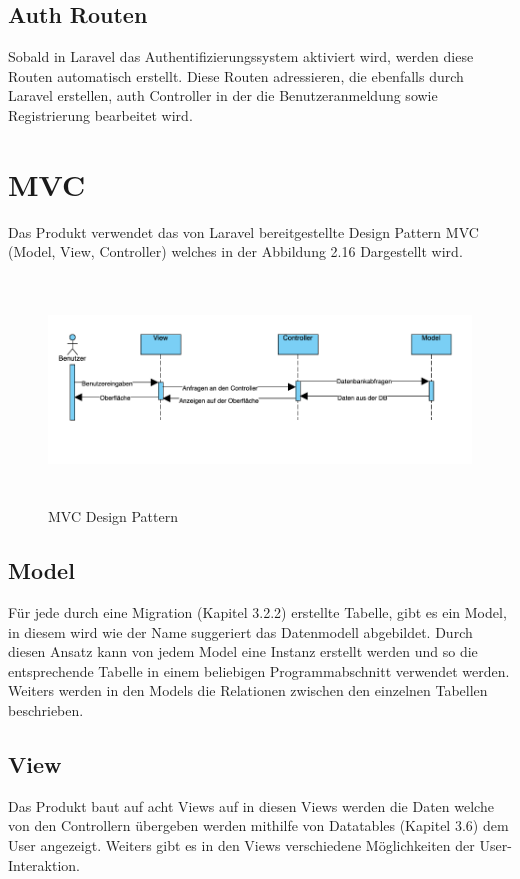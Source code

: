 \subsection{Auth Routen}
Sobald in Laravel das Authentifizierungssystem aktiviert wird, werden diese Routen automatisch erstellt. Diese Routen adressieren, die ebenfalls durch Laravel erstellen, auth Controller in der die Benutzeranmeldung sowie Registrierung bearbeitet wird.

\newpage
\section{MVC}\label{sec: MVC}
Das Produkt verwendet das von Laravel bereitgestellte Design Pattern MVC (Model, View, Controller) welches in der Abbildung 2.16 Dargestellt wird. 

\begin{figure}[h]
	\centering
	\includegraphics[height=6cm,width=18cm]{images/MVC}
	\caption{MVC Design Pattern}
	\label{fig:MVC}
\end{figure}

\subsection{Model}
Für jede durch eine Migration (Kapitel 3.2.2)  erstellte Tabelle, gibt es ein Model, in diesem wird wie der Name suggeriert das Datenmodell abgebildet. Durch diesen Ansatz kann von jedem Model eine Instanz erstellt werden und so die entsprechende Tabelle in einem beliebigen Programmabschnitt verwendet werden. Weiters werden in den Models die Relationen zwischen den einzelnen Tabellen beschrieben.
\subsection{View}
Das Produkt baut auf acht Views auf in diesen Views werden die Daten welche von den Controllern übergeben werden mithilfe von Datatables (Kapitel 3.6) dem User angezeigt. Weiters gibt es in den Views verschiedene Möglichkeiten der User-Interaktion.
